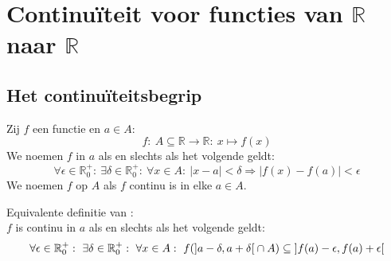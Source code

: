 \documentclass[main.tex]{subfiles}
\begin{document}
\chapter{Continu\"iteit voor functies van $\mathbb{R}$ naar $\mathbb{R}$}
\label{cha:cont-in-r}

\section{Het continu\"iteitsbegrip}
\label{sec:het-cont}


\begin{de}
  Zij $f$ een functie en $a\in A$:
  \[ f:\ A \subseteq \mathbb{R} \rightarrow \mathbb{R}:\ x \mapsto f(x) \]
  We noemen $f$  in $a$ als en slechts als het volgende geldt:
  \[ \forall \epsilon \in \mathbb{R}_{0}^{+}:\ \exists \delta \in \mathbb{R}_{0}^{+}:\ \forall x\in A:\ |x-a| < \delta \Rightarrow |f(x) -f(a)| < \epsilon \]
  We noemen $f$  op $A$ als $f$ continu is in elke $a\in A$.
\end{de}

\begin{st}
  Equivalente definitie van :\\
  $f$ is continu in $a$ als en slechts als het volgende geldt:
  \[ \forall \epsilon \in \mathbb{R}_{0}^{+}:\ \exists \delta \in \mathbb{R}_{0}^{+}:\ \forall x\in A:\ f(\interval[open]{a-\delta}{a+\delta} \cap A) \subseteq \interval[open]{f(a)-\epsilon}{f(a)+\epsilon} \]
\end{st}
\end{document}
